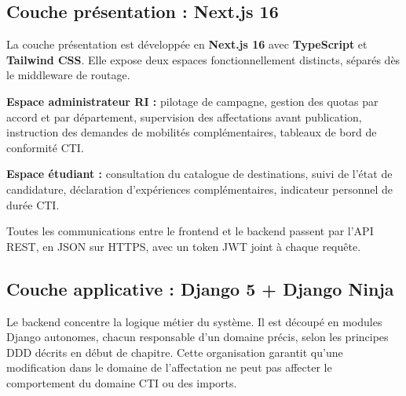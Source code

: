 \subsection{Couche présentation : Next.js 16}

La couche présentation est développée en \textbf{Next.js 16} avec \textbf{TypeScript} et \textbf{Tailwind CSS}. Elle expose deux espaces fonctionnellement distincts, séparés dès le middleware de routage.

\textbf{Espace administrateur RI :} pilotage de campagne, gestion des quotas par accord et par département, supervision des affectations avant publication, instruction des demandes de mobilités complémentaires, tableaux de bord de conformité CTI.

\textbf{Espace étudiant :} consultation du catalogue de destinations, suivi de l'état de candidature, déclaration d'expériences complémentaires, indicateur personnel de durée CTI.

Toutes les communications entre le frontend et le backend passent par l'API REST, en JSON sur HTTPS, avec un token JWT joint à chaque requête. 

\subsection{Couche applicative : Django 5 + Django Ninja}

Le backend concentre la logique métier du système. Il est découpé en modules Django autonomes, chacun responsable d'un domaine précis, selon les principes DDD décrits en début de chapitre. Cette organisation garantit qu'une modification dans le domaine de l'affectation ne peut pas affecter le comportement du domaine CTI ou des imports.

